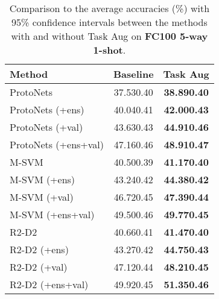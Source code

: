 \documentclass[10pt,twocolumn,letterpaper]{article}
\begin{document}
\begin{table}[t]
\caption{Comparison to the average accuracies (\%) with 95\% confidence intervals between the methods with and without Task Aug on \textbf{FC100 5-way 1-shot}.}
\label{FC100_1shot}
\begin{center}
\begin{tabular}{lcc}
\toprule[1pt]
\textbf{Method} & Baseline & Task Aug \\
\hline
ProtoNets~\cite{snell2017prototypical} & 37.530.40 & \textbf{38.890.40
}\\
ProtoNets (+ens) & 40.040.41 & \textbf{42.000.43}\\
ProtoNets (+val) & 43.630.43 & \textbf{44.910.46}\\
ProtoNets (+ens+val) & 47.160.46 & \textbf{48.910.47}\\
\hline
M-SVM~\cite{lee2019meta} & 40.500.39 & \textbf{41.170.40}\\
M-SVM (+ens) & 43.240.42 & \textbf{44.380.42}\\
M-SVM (+val) & 46.720.45 & \textbf{47.390.44}\\
M-SVM (+ens+val) & 49.500.46 & \textbf{49.770.45}\\
\hline
R2-D2~\cite{bertinetto2018meta} & 40.660.41 & \textbf{41.470.40}\\
R2-D2 (+ens) & 43.270.42 & \textbf{44.750.43}\\
R2-D2 (+val) & 47.120.44 & \textbf{48.210.45}\\
R2-D2 (+ens+val) & 49.920.45 & \textbf{51.350.46}\\
\bottomrule[1pt]
\end{tabular}
\end{center}
\end{table}
\end{document}
